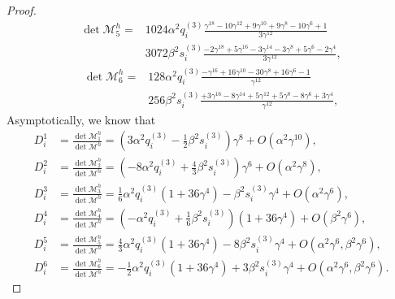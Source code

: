 \documentclass[11pt,letterpaper]{amsart}
\newcommand{\mM}{\mathcal{M}}
\theoremstyle{definition}
\theoremstyle{remark}
\numberwithin{equation}{section}
\begin{document}
\begin{proof}
\begin{equation}
\begin{split}
\det \mM^h_5=&1024\alpha^2 q^{(3)}_i\frac{
      \gamma^{18} - 10\gamma^{12}  + 9\gamma^{10} + 9\gamma^8  - 10\gamma^6  + 1 }{3\gamma^{12}} \\
      &3072\beta^2 s^{(3)}_i \frac{- 2\gamma^{18}  + 5\gamma^{16} - 3\gamma^{14} - 3\gamma^8  + 5\gamma^6  - 2\gamma^4  }{3\gamma^{12}},
\end{split}
\end{equation}
\begin{equation}
    \begin{split}
        \det \mM^h_6=&128\alpha^2 q^{(3)}_i \frac{
      -\gamma^{16}  + 16\gamma^{10} - 30\gamma^8  + 16\gamma^6  - 1}{\gamma^{12}}\\
      &256\beta^2 s^{(3)}_i \frac{+ 3\gamma^{16}  - 8\gamma^{14}  + 5\gamma^{12}   + 5\gamma^8  - 8\gamma^6  + 3\gamma^4  }{\gamma^{12}},
    \end{split}
\end{equation}
Asymptotically, we know that
\begin{equation}
\begin{split}
D_i^1&=\frac{\det \mM^h_1}{\det \mM^h}=\left(3\alpha^2q^{(3)}_i-\frac{1}{2}\beta^2 s^{(3)}_i\right)\gamma^8+O(\alpha^2\gamma^{10}),\\
D_i^2&=\frac{\det \mM^h_2}{\det \mM^h}=\left(-8\alpha^2q^{(3)}_i+\frac{4}{3}\beta^2 s^{(3)}_i\right)\gamma^6+O(\alpha^2\gamma^{8}),\\
D_i^3&=\frac{\det \mM^h_3}{\det \mM^h}=\frac{1}{6}\alpha^2 q^{(3)}_i\left(1+36\gamma^4\right)-\beta^2 s^{(3)}_i\gamma^4+O(\alpha^2\gamma^6),\\
D_i^4&=\frac{\det \mM^h_4}{\det \mM^h}=\left(-\alpha^2 q^{(3)}_i+\frac{1}{6}\beta^2 s^{(3)}_i\right)\left(1+36\gamma^4\right)+O(\beta^2\gamma^6),\\
D_i^5&=\frac{\det \mM^h_5}{\det \mM^h}=\frac{4}{3}\alpha^2 q^{(3)}_i\left(1+36\gamma^4\right)-8\beta^2 s^{(3)}_i\gamma^4+O(\alpha^2\gamma^6,\beta^2\gamma^6 ),\\
D_i^6&=\frac{\det \mM^h_6}{\det \mM^h}=-\frac{1}{2}\alpha^2 q^{(3)}_i\left(1+36\gamma^4\right)+3\beta^2 s^{(3)}_i\gamma^4+O(\alpha^2\gamma^6,\beta^2\gamma^6 ).
\end{split}
\end{equation}


\end{proof}
\end{document}
